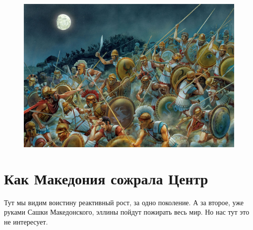\begin{figure}[h!tb]
	\centering\includegraphics[scale=0.2]{regional_hehemons/1613656143131456586.png}
	\label{fig:heh2} %
\end{figure}

\section{Как Македония сожрала Центр}
Тут мы видим воистину реактивный рост, за одно поколение. А за второе, уже руками Сашки Македонского, эллины пойдут пожирать весь мир. Но нас тут это не интересует.

